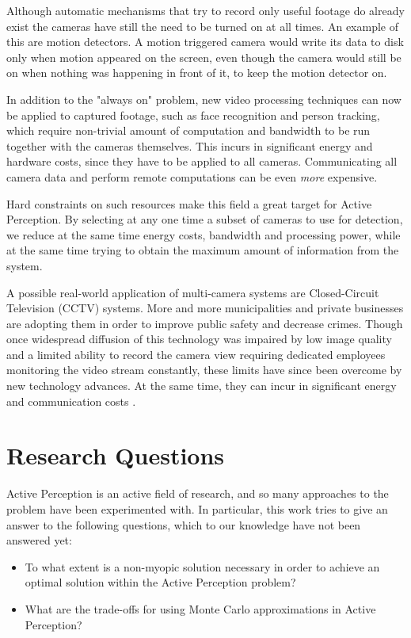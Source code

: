 Although automatic mechanisms that try to record only useful footage do already exist the cameras
have still the need to be turned on at all times. An example of this are motion detectors. A motion
triggered camera would write its data to disk only when motion appeared on the screen, even though
the camera would still be on when nothing was happening in front of it, to keep the motion detector
on.

In addition to the "always on" problem, new video processing techniques can now be applied to
captured footage, such as face recognition and person tracking, which require non-trivial amount of
computation and bandwidth to be run together with the cameras themselves. This incurs in significant
energy and hardware costs, since they have to be applied to all cameras. Communicating all camera
data and perform remote computations can be even \textit{more} expensive.

Hard constraints on such resources make this field a great target for Active Perception. By
selecting at any one time a subset of cameras to use for detection, we reduce at the same time
energy costs, bandwidth and processing power, while at the same time trying to obtain the maximum
amount of information from the system.

A possible real-world application of multi-camera systems are Closed-Circuit Television (CCTV)
systems. More and more municipalities and private businesses are adopting them in order to improve
public safety and decrease crimes\cite{cit:cctv}. Though once widespread diffusion of this
technology was impaired by low image quality and a limited ability to record the camera view
requiring dedicated employees monitoring the video stream constantly, these limits have since been
overcome by new technology advances. At the same time, they can incur in significant energy and
communication costs \cite{cit:cctvenergy}.

\section{Research Questions}

Active Perception is an active field of research, and so many approaches to the problem have been
experimented with. In particular, this work tries to give an answer to the following questions,
which to our knowledge have not been answered yet:

\begin{itemize}
\item To what extent is a non-myopic solution necessary in order to achieve an optimal solution
within the Active Perception problem?
\item What are the trade-offs for using Monte Carlo approximations in Active Perception?
\end{itemize}

